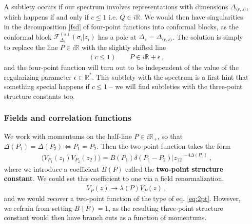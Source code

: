\documentclass[12pt, a4paper, notitlepage, twoside]{report}
\numberwithin{equation}{section}
\theoremstyle{break}
\begin{document}
A subtlety occurs if our spectrum involves representations with dimensions $\Delta_{\langle r, s\rangle}$, which happens if and only if $c\leq 1$ i.e. $Q\in i\mathbb{R}$. 
We would then have singularities in the decomposition \eqref{fsd} of four-point functions into conformal blocks, as the conformal block $\mathcal{F}_{\Delta_s}^{(s)}(\sigma_i|z_i)$ has a pole at $\Delta_s = \Delta_{\langle r, s\rangle}$. 
The solution is simply to replace the line $P\in i\mathbb{R}$ with the slightly shifted line 
\begin{align}
 (c\leq 1) \qquad P \in i\mathbb{R} + \epsilon\ ,
\end{align}
and the four-point function will turn out to be independent of the value of the regularizing parameter $\epsilon \in \mathbb{R}^*$. 
This subtlety with the spectrum is a first hint that something special happens if $c\leq 1$ -- we will find subtleties with the three-point structure constants too. 


\subsubsection{Fields and correlation functions}

We work with momentums on the half-line $P\in i\mathbb{R}_+$, so that $\Delta(P_1)=\Delta(P_2)\iff P_1=P_2$. 
Then the two-point function takes the form
\begin{align}
 \Big\langle V_{P_1}(z_1) V_{P_2}(z_2)\Big\rangle = B(P_1)\delta(P_1-P_2) |z_{12}|^{-4\Delta(P_1)}\ , 
\label{vvc}
\end{align}
where we introduce a coefficient $B(P)$ called the \textbf{two-point structure constant}. 
We could set this coefficient to one via a field renormalization,
\begin{align}
 V_P(z) \to \lambda(P)  V_P(z) \ ,
\label{vlv}
\end{align}
and we would recover a two-point function of the type of eq. \eqref{eq:2pt}. However, we refrain from setting $B(P)=1$, as the resulting three-point structure constant would then have branch cuts as a function of momentums.  
\end{document}
